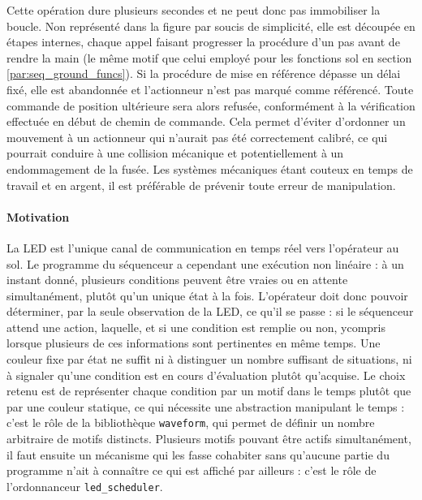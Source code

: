 Cette opération dure plusieurs secondes et ne peut donc pas immobiliser la boucle. Non représenté dans la figure par soucis de
simplicité, elle est découpée en étapes internes, chaque appel faisant progresser la procédure d'un pas avant de rendre la main
(le même motif que celui employé pour les fonctions sol en section \ref{par:seq_ground_funcs}). Si la procédure de mise en
référence dépasse un délai fixé, elle est abandonnée et l'actionneur n'est pas marqué comme référencé. Toute commande de position
ultérieure sera alors refusée, conformément à la vérification effectuée en début de chemin de commande. Cela permet d'éviter
d'ordonner un mouvement à un actionneur qui n'aurait pas été correctement calibré, ce qui pourrait conduire à une collision
mécanique et potentiellement à un endommagement de la fusée. Les systèmes mécaniques étant couteux en temps de travail et en
argent, il est préférable de prévenir toute erreur de manipulation.

\newpage

\label{subsubsubsec:seq_leds}

\paragraph*{Motivation} La LED est l'unique canal de communication en temps réel vers l'opérateur au sol. Le programme du
séquenceur a cependant une exécution non linéaire : à un instant donné, plusieurs conditions peuvent être vraies ou en attente
simultanément, plutôt qu'un unique état à la fois. L'opérateur doit donc pouvoir déterminer, par la seule observation de la LED,
ce qu'il se passe : si le séquenceur attend une action, laquelle, et si une condition est remplie ou non, ycompris lorsque
plusieurs de ces informations sont pertinentes en même temps. Une couleur fixe par état ne suffit ni à distinguer un nombre
suffisant de situations, ni à signaler qu'une condition est en cours d'évaluation plutôt qu'acquise. Le choix retenu est de
représenter chaque condition par un motif dans le temps plutôt que par une couleur statique, ce qui nécessite une abstraction
manipulant le temps : c'est le rôle de la bibliothèque \texttt{waveform}, qui permet de définir un nombre arbitraire de motifs
distincts. Plusieurs motifs pouvant être actifs simultanément, il faut ensuite un mécanisme qui les fasse cohabiter sans
qu'aucune partie du programme n'ait à connaître ce qui est affiché par ailleurs : c'est le rôle de l'ordonnanceur
\texttt{led\_scheduler}.

